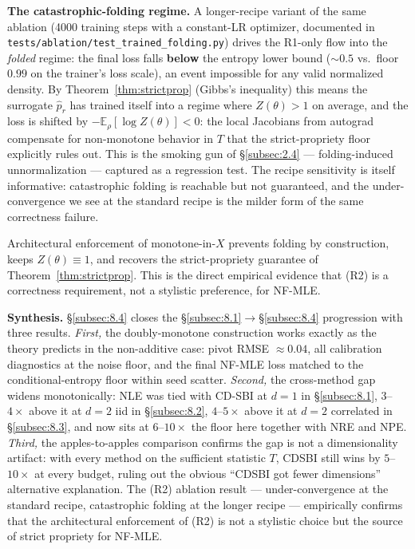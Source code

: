 \documentclass[11pt]{article}
\begin{document}
\textbf{The catastrophic-folding regime.} A longer-recipe variant of
the same ablation (4000 training steps with a constant-LR optimizer,
documented in \texttt{tests/ablation/test\_trained\_folding.py}) drives
the R1-only flow into the \emph{folded} regime: the final loss falls
\textbf{below} the entropy lower bound (\(\sim 0.5\) vs.\ floor
\(0.99\) on the trainer's loss scale), an event impossible for any
valid normalized density. By Theorem~\ref{thm:strictprop} (Gibbs's
inequality) this means the surrogate \(\hat p_r\) has trained itself
into a regime where \(Z(\theta) > 1\) on average, and the loss is
shifted by \(-\mathbb{E}_\rho[\log Z(\theta)] < 0\): the local Jacobians
from autograd compensate for non-monotone behavior in \(T\) that the
strict-propriety floor explicitly rules out. This is the smoking gun
of \S\ref{subsec:2.4} --- folding-induced unnormalization --- captured
as a regression test. The recipe sensitivity is itself informative:
catastrophic folding is reachable but not guaranteed, and the
under-convergence we see at the standard recipe is the milder form of
the same correctness failure.

Architectural enforcement of monotone-in-\(X\) prevents folding by
construction, keeps \(Z(\theta) \equiv 1\), and recovers the
strict-propriety guarantee of Theorem~\ref{thm:strictprop}. This is the
direct empirical evidence that (R2) is a correctness requirement, not
a stylistic preference, for NF-MLE.

\textbf{Synthesis.} \S\ref{subsec:8.4} closes the
\S\ref{subsec:8.1}\(\to\)\S\ref{subsec:8.4} progression with three
results. \emph{First,} the doubly-monotone construction works exactly
as the theory predicts in the non-additive case: pivot RMSE \(\approx
0.04\), all calibration diagnostics at the noise floor, and the final
NF-MLE loss matched to the conditional-entropy floor within seed
scatter. \emph{Second,} the cross-method gap widens monotonically:
NLE was tied with CD-SBI at \(d=1\) in \S\ref{subsec:8.1},
\(3\)--\(4\times\) above it at \(d=2\) iid in \S\ref{subsec:8.2},
\(4\)--\(5\times\) above it at \(d=2\) correlated in
\S\ref{subsec:8.3}, and now sits at \(6\)--\(10\times\) the floor here
together with NRE and NPE. \emph{Third,} the apples-to-apples
comparison confirms the gap is not a dimensionality artifact: with
every method on the sufficient statistic \(T\), CDSBI still wins by
\(5\)--\(10\times\) at every budget, ruling out the obvious
``CDSBI got fewer dimensions'' alternative explanation. The (R2)
ablation result --- under-convergence at the standard recipe,
catastrophic folding at the longer recipe --- empirically confirms
that the architectural enforcement of (R2) is not a stylistic choice
but the source of strict propriety for NF-MLE.
\end{document}
